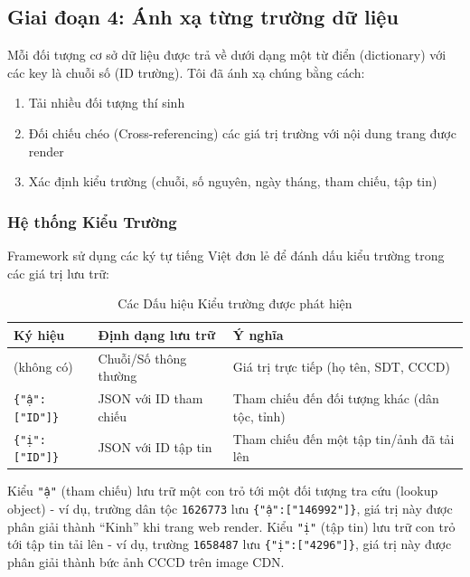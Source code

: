 \documentclass[12pt,a4paper]{article}
\begin{document}
\subsection{Giai đoạn 4: Ánh xạ từng trường dữ liệu}

Mỗi đối tượng cơ sở dữ liệu được trả về dưới dạng một từ điển (dictionary) với các key là chuỗi số (ID trường). Tôi đã ánh xạ chúng bằng cách:
\begin{enumerate}[noitemsep]
    \item Tải nhiều đối tượng thí sinh
    \item Đối chiếu chéo (Cross-referencing) các giá trị trường với nội dung trang được render
    \item Xác định kiểu trường (chuỗi, số nguyên, ngày tháng, tham chiếu, tập tin)
\end{enumerate}

\subsubsection{Hệ thống Kiểu Trường}

Framework sử dụng các ký tự tiếng Việt đơn lẻ để đánh dấu kiểu trường trong các giá trị lưu trữ:

\begin{table}[H]
\centering
\caption{Các Dấu hiệu Kiểu trường được phát hiện}
\begin{tabular}{@{}lll@{}}
\toprule
\textbf{Ký hiệu} & \textbf{Định dạng lưu trữ} & \textbf{Ý nghĩa} \\
\midrule
(không có) & Chuỗi/Số thông thường & Giá trị trực tiếp (họ tên, SDT, CCCD) \\
\texttt{\{"ậ":["ID"]\}} & JSON với ID tham chiếu & Tham chiếu đến đối tượng khác (dân tộc, tỉnh) \\
\texttt{\{"ị":["ID"]\}} & JSON với ID tập tin & Tham chiếu đến một tập tin/ảnh đã tải lên \\
\bottomrule
\end{tabular}
\end{table}

\noindent Kiểu \texttt{"ậ"} (tham chiếu) lưu trữ một con trỏ tới một đối tượng tra cứu (lookup object) - ví dụ, trường dân tộc \texttt{1626773} lưu \texttt{\{"ậ":["146992"]\}}, giá trị này được phân giải thành ``Kinh'' khi trang web render. Kiểu \texttt{"ị"} (tập tin) lưu trữ con trỏ tới tập tin tải lên - ví dụ, trường \texttt{1658487} lưu \texttt{\{"ị":["4296"]\}}, giá trị này được phân giải thành bức ảnh CCCD trên image CDN.
\end{document}
